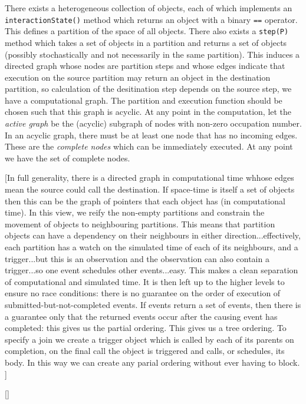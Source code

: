 \documentclass[a4paper]{article}
\begin{document}
There exists a heterogeneous collection of objects, each of which implements an \texttt{interactionState()} method which returns an object with a binary \texttt{==} operator. This defines a partition of the space of all objects. There also exists a \texttt{step(P)} method which takes a set of objects in a partition and returns a set of objects (possibly stochastically and not necessarily in the same partition). This induces a directed graph whose nodes are partition steps and whose edges indicate that execution on the source partition may return an object in the destination partition, so calculation of the desitination step depends on the source step, we have a computational graph. The partition and execution function should be chosen such that this graph is acyclic. At any point in the computation, let the \textit{active graph} be the (acyclic) subgraph of nodes with non-zero occupation number. In an acyclic graph, there must be at least one node that has no incoming edges. These are the \textit{complete nodes} which can be immediately executed. At any point we have the set of complete nodes.

[In full generality, there is a directed graph in computational time whhose edges mean the source could call the destination. If space-time is itself a set of objects then this can be the graph of pointers that each object has (in computational time). In this view, we reify the non-empty partitions and constrain the movement of objects to neighbouring partitions. This means that partition objects can have a dependency on their neighbours in either direction...effectively, each partition has a watch on the simulated time of each of its neighbours, and a trigger...but this is an observation and the observation can also contain a trigger...so one event schedules other events...easy. This makes a clean separation of computational and simulated time. It is then left up to the higher levels to ensure no race conditions: there is no guarantee on the order of execution of submitted-but-not-completed events. If events return a set of events, then there is a guarantee only that the returned events occur after the causing event has completed: this gives us the partial ordering. This gives us a tree ordering. To specify a join we create a trigger object which is called by each of its parents on completion, on the final call the object is triggered and calls, or schedules, its body. In this way we can create any parial ordering without ever having to block. ]

[]
\end{document}
